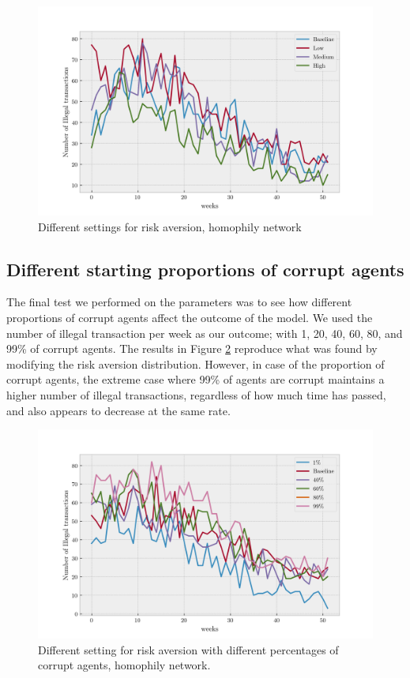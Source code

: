 \documentclass[letterpaper, 11pt]{article}
\begin{document}
\begin{figure}[htbp]
\centering
\includegraphics[width=.9\linewidth]{img/f5.png}
\caption{\label{fig:org168b7a5}
Different settings for risk aversion, homophily network}
\end{figure}

\subsection{Different starting proportions of corrupt agents}
\label{sec:orgbe1af86}
The final test we performed on the parameters was to see how different proportions of corrupt agents affect the outcome of the model. We used the number of illegal
transaction per week as our outcome; with 1, 20, 40, 60, 80, and 99\% of corrupt agents. The results in Figure \ref{fig:orgca41e02} reproduce what was found by modifying the risk aversion
distribution. However, in case of the proportion of corrupt agents, the extreme case where 99\% of agents are corrupt maintains a higher number of illegal transactions, regardless of how much time has passed, and also appears to decrease at the same rate.

\begin{figure}[htbp]
\centering
\includegraphics[width=.9\linewidth]{img/f6.png}
\caption{\label{fig:orgca41e02}
Different setting for risk aversion with different percentages of corrupt agents, homophily network.}
\end{figure}
\end{document}
